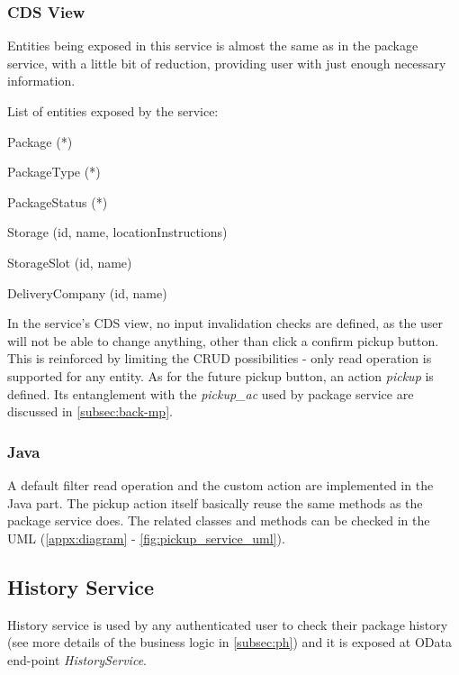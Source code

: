 \subsubsection{CDS View}

Entities being exposed in this service is almost the same as in the package service, with a little bit of reduction, providing user with just enough necessary information. 

\bigskip
\noindent
List of entities exposed by the service:
\begin{compactenum}
	\item Package (*)
    \item PackageType (*)
    \item PackageStatus (*)
    \item Storage (id, name, locationInstructions)
    \item StorageSlot (id, name)
    \item DeliveryCompany (id, name)
\end{compactenum}

\bigskip
In the service's CDS view, no input invalidation checks are defined, as the user will not be able to change anything, other than click a confirm pickup button. This is reinforced by limiting the CRUD possibilities - only read operation is supported for any entity. As for the future pickup button, an action \textit{pickup} is defined. Its entanglement with the \textit{pickup\_ac} used by package service are discussed in \autoref{subsec:back-mp}.


\subsubsection{Java}

A default filter read operation and the custom action are implemented in the Java part. The pickup action itself basically reuse the same methods as the package service does. The related classes and methods can be checked in the UML (\autoref{appx:diagram} - \autoref{fig:pickup_service_uml}). 


\subsection{History Service}
\label{subsec:back-ph}

History service is used by any authenticated user to check their package history (see more details of the business logic in \autoref{subsec:ph}) and it is exposed at OData end-point \textit{HistoryService}.

